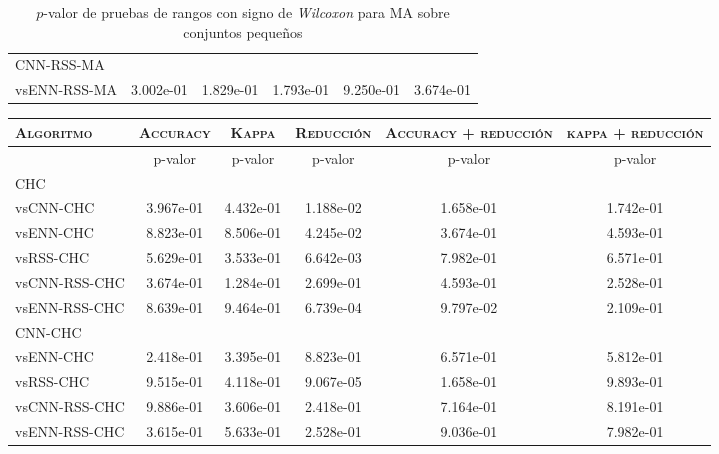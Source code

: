 \begin{table}[h!]
\begin{adjustbox}{max width =\textwidth}
\begin{tabular}{l c c c c c}
\hline

CNN-RSS-MA\\
vsENN-RSS-MA & 3.002e-01 & 1.829e-01 & 1.793e-01 & 9.250e-01 & 3.674e-01 \\ 

\hline 

\end{tabular}
\end{adjustbox}
\caption[Pruebas de \emph{Wilcoxon} entre MA y variaciones para conjuntos pequeños]{$p$-valor de pruebas de rangos con signo de \emph{Wilcoxon} para MA sobre conjuntos pequeños}
\label{wilcox-MA-peq}
\end{table}


\begin{table}[h!]
\centering
\begin{adjustbox}{max width =\textwidth}
\begin{tabular}{l c c c c c}
\hline
	\textsc{Algoritmo}
	& \multicolumn{1}{c}{\textsc{Accuracy}}
	& \multicolumn{1}{c}{\textsc{Kappa}}
	& \multicolumn{1}{c}{\textsc{Reducción}} 
	& \multicolumn{1}{c}{\textsc{Accuracy + reducción}} 
	& \multicolumn{1}{c}{\textsc{kappa + reducción}} \\
\hline
\hline

 & p-valor & p-valor & p-valor & p-valor & p-valor \\

CHC\\
vsCNN-CHC     & 3.967e-01 & 4.432e-01 & 1.188e-02 & 1.658e-01 & 1.742e-01 \\ 
vsENN-CHC     & 8.823e-01 & 8.506e-01 & 4.245e-02 & 3.674e-01 & 4.593e-01 \\ 
vsRSS-CHC     & 5.629e-01 & 3.533e-01 & 6.642e-03 & 7.982e-01 & 6.571e-01 \\ 
vsCNN-RSS-CHC & 3.674e-01 & 1.284e-01 & 2.699e-01 & 4.593e-01 & 2.528e-01 \\ 
vsENN-RSS-CHC & 8.639e-01 & 9.464e-01 & 6.739e-04 & 9.797e-02 & 2.109e-01 \\ 

\hline

CNN-CHC\\
vsENN-CHC & 2.418e-01 & 3.395e-01 & 8.823e-01 & 6.571e-01 & 5.812e-01 \\
vsRSS-CHC & 9.515e-01 & 4.118e-01 & 9.067e-05 & 1.658e-01 & 9.893e-01 \\
vsCNN-RSS-CHC & 9.886e-01 & 3.606e-01 & 2.418e-01 & 7.164e-01 & 8.191e-01 \\ 
vsENN-RSS-CHC & 3.615e-01 & 5.633e-01 & 2.528e-01 & 9.036e-01 & 7.982e-01 \\ 


\end{tabular}
\end{adjustbox}
\end{table}
